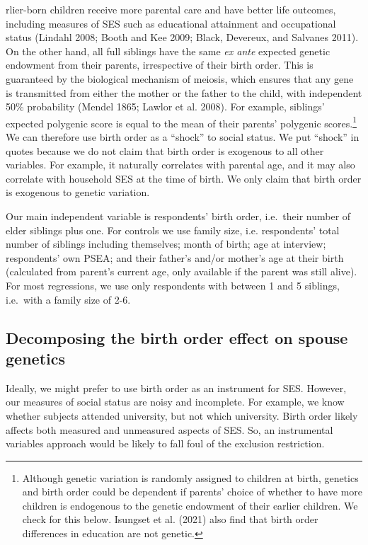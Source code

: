 \documentclass[
]{article}
\theoremstyle{definition}
\theoremstyle{definition}
\theoremstyle{definition}
\theoremstyle{definition}
\theoremstyle{remark}
\begin{document}
rlier-born children receive more
parental care and have better life outcomes, including measures of SES such as
educational attainment and occupational status (Lindahl 2008; Booth and Kee 2009; Black, Devereux, and Salvanes 2011). On the other hand, all full siblings have the same \emph{ex ante}
expected genetic endowment from their parents, irrespective of their birth
order. This is guaranteed by the biological mechanism of meiosis, which ensures
that any gene is transmitted from either the mother or the father to the
child, with independent 50\% probability (Mendel 1865; Lawlor et al. 2008).
For example, siblings' expected polygenic score is equal to the mean of
their parents' polygenic scores.\footnote{Although genetic variation is randomly assigned to children at
  birth, genetics and birth order could be dependent if parents'
  choice of whether to have more children is endogenous to the genetic
  endowment of their earlier children. We check for this below.
  Isungset et al. (2021) also find that birth order differences in education are
  not genetic.} We can therefore use birth order as a
``shock'' to social status. We put ``shock'' in quotes because we do not claim that birth
order is exogenous to all other variables. For example, it naturally correlates
with parental age, and it may also correlate with household SES at the time of
birth. We only claim that birth order is exogenous to genetic variation.

Our main independent variable is respondents' birth order, i.e.~their
number of elder siblings plus one. For controls we use family size, i.e.
respondents' total number of siblings including themselves; month of birth; age
at interview; respondents' own PSEA; and their father's and/or mother's age
at their birth (calculated from parent's current age, only available if
the parent was still alive). For most regressions, we use only
respondents with between 1 and 5 siblings, i.e.~with a family size of
2-6.

\hypertarget{decomposing-the-birth-order-effect-on-spouse-genetics}{%
\subsection{Decomposing the birth order effect on spouse genetics}\label{decomposing-the-birth-order-effect-on-spouse-genetics}}

Ideally, we might prefer to use birth order as an instrument for SES. However,
our measures of social status are noisy and incomplete. For example, we know
whether subjects attended university, but not which university. Birth order
likely affects both measured and unmeasured aspects of SES. So, an instrumental
variables approach would be likely to fall foul of the exclusion restriction.
\end{document}
